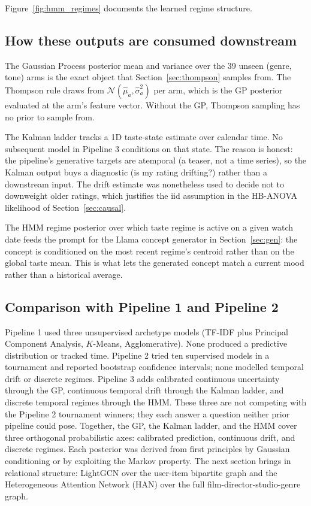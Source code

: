 \documentclass{article}
\begin{document}
Figure~\ref{fig:hmm_regimes} documents the learned regime structure.

\subsection{How these outputs are consumed downstream}

The Gaussian Process posterior mean and variance over the 39 unseen (genre, tone) arms is the exact object that Section~\ref{sec:thompson} samples from. The Thompson rule draws from $\mathcal{N}(\hat\mu_a, \hat\sigma_a^2)$ per arm, which is the GP posterior evaluated at the arm's feature vector. Without the GP, Thompson sampling has no prior to sample from.

The Kalman ladder tracks a 1D taste-state estimate over calendar time. No subsequent model in Pipeline 3 conditions on that state. The reason is honest: the pipeline's generative targets are atemporal (a teaser, not a time series), so the Kalman output buys a diagnostic (is my rating drifting?) rather than a downstream input. The drift estimate was nonetheless used to decide not to downweight older ratings, which justifies the iid assumption in the HB-ANOVA likelihood of Section~\ref{sec:causal}.

The HMM regime posterior over which taste regime is active on a given watch date feeds the prompt for the Llama concept generator in Section~\ref{sec:gen}: the concept is conditioned on the most recent regime's centroid rather than on the global taste mean. This is what lets the generated concept match a current mood rather than a historical average.

\subsection{Comparison with Pipeline 1 and Pipeline 2}

Pipeline 1 used three unsupervised archetype models (TF-IDF plus Principal Component Analysis, $K$-Means, Agglomerative). None produced a predictive distribution or tracked time. Pipeline 2 tried ten supervised models in a tournament and reported bootstrap confidence intervals; none modelled temporal drift or discrete regimes. Pipeline 3 adds calibrated continuous uncertainty through the GP, continuous temporal drift through the Kalman ladder, and discrete temporal regimes through the HMM. These three are not competing with the Pipeline 2 tournament winners; they each answer a question neither prior pipeline could pose. Together, the GP, the Kalman ladder, and the HMM cover three orthogonal probabilistic axes: calibrated prediction, continuous drift, and discrete regimes. Each posterior was derived from first principles by Gaussian conditioning or by exploiting the Markov property. The next section brings in relational structure: LightGCN over the user-item bipartite graph and the Heterogeneous Attention Network (HAN) over the full film-director-studio-genre graph.
\end{document}
